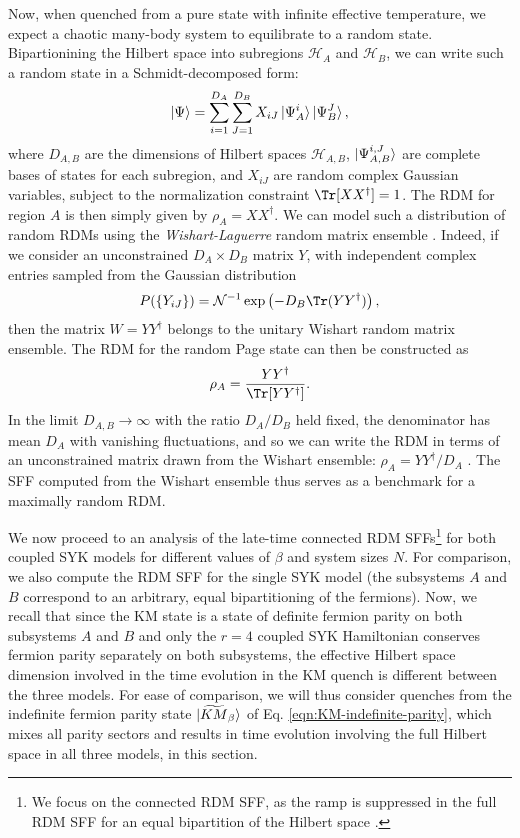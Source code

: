 \documentclass[reprint, floatfix,eqsecnum,superscriptaddress,preprint,nofootinbib,onecolumn,amsmath,amssymb,aps,prb]{revtex4-2}
\begin{document}
Now, when quenched from a pure state with infinite effective temperature, we expect a chaotic many-body system to equilibrate to a random state. Bipartionining the Hilbert space into subregions $\mathcal{H}_A$ and $\mathcal{H}_B$, we can write such a random state in a Schmidt-decomposed form:
\begin{align}
    \ket{\Psi} = \sum_{i=1}^{D_A}\sum_{J=1}^{D_B} X_{iJ} \ket{\Psi_A^i}\ket{\Psi_B^J},
\end{align}
where $D_{A,B}$ are the dimensions of Hilbert spaces $\mathcal{H}_{A,B}$, $\ket{\Psi_{A,B}^{i,J}}$ are complete bases of states for each subregion, and $X_{iJ}$ are random complex Gaussian variables, subject to the normalization constraint $\Tr[XX^\dagger] = 1$. The RDM for region $A$ is then simply given by $\rho_A = XX^\dagger$. We can model such a distribution of random RDMs using the \emph{Wishart-Laguerre} random matrix ensemble \cite{Liu2018sff,edelman_rao_2005,forresterbook}. Indeed, if we consider an unconstrained $D_A \times D_B$ matrix $Y$, with independent complex entries sampled from the Gaussian distribution
\begin{align}
    P(\{Y_{iJ}\}) = \mathcal{N}^{-1} \exp\left( - D_B \Tr(YY^\dagger) \right),
\end{align}
then the matrix $W=YY^\dagger$ belongs to the unitary Wishart random matrix ensemble. The RDM for the random Page state can then be constructed as 
\begin{align}
    \rho_A = \frac{YY^\dagger}{\Tr[YY^\dagger]}.
\end{align}
In the limit $D_{A,B} \to \infty$ with the ratio $D_A / D_B$ held fixed, the denominator has mean $D_A$ with vanishing fluctuations, and so we can write the RDM in terms of an unconstrained matrix drawn from the Wishart ensemble: $\rho_A  = YY^\dagger / D_A$ \cite{Chen2018}. The SFF computed from the Wishart ensemble thus serves as a benchmark for a maximally random RDM.

We now proceed to an analysis of the late-time connected RDM SFFs\footnote{We focus on the connected RDM SFF, as the ramp is suppressed in the full RDM SFF for an equal bipartition of the Hilbert space \cite{Chen2018}.} for both coupled SYK models %
for different values of $\beta$ and system sizes $N$. For comparison, we also compute the RDM SFF for the single SYK model (the subsystems $A$ and $B$ correspond to an arbitrary, equal bipartitioning of the fermions). Now, we recall that since the KM state is a state of definite fermion parity on both subsystems $A$ and $B$ and only the $r=4$ coupled SYK Hamiltonian conserves fermion parity separately on both subsystems, the effective Hilbert space dimension involved in the time evolution in the KM quench is different between the three models. For ease of comparison, we will thus consider quenches from the indefinite fermion parity state $\ket{\widetilde{KM}_\beta}$ of Eq. \eqref{eqn:KM-indefinite-parity}, which mixes all parity sectors and results in time evolution involving the full Hilbert space in all three models, in this section. 
\end{document}
